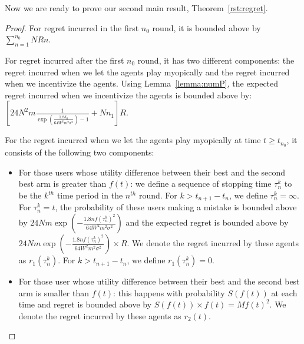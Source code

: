                     Now we are ready to prove our second main result, Theorem~\ref{rst:regret}.

                    \begin{proof}
                    For regret incurred in the first $n_0$ round, it is bounded above by $\sum_{n=1}^{n_{0}}NRn$.

                    For regret incurred after the first $n_0$ round, it has two different components: the regret incurred when we let the agents play myopically and the regret incurred when we incentivize the agents. Using Lemma~\ref{lemma:numP}, the expected regret incurred when we incentivize the agents is bounded above by: $\left[24N^2 m \frac{1}{\exp(\frac{1.8\delta_{0}}{64W^2 m^2\sigma^2})-1} + Nn_1\right]R$.

                    For the regret incurred when we let the agents play myopically at time $t\geq t_{n_0}$, it consists of the following two components:
                    \begin{itemize}
                    \item For those users whose utility difference between their best and the second best arm is greater than $f(t)$: we define a sequence of stopping time $\tau_{n}^{k}$ to be the $k^{th}$ time period in the $n^{th}$ round. For $k>t_{n+1}-t_{n}$, we define $\tau_{n}^{k}=\infty$. For $\tau_{n}^{k}=t$, the probability of these users making a mistake is bounded above by $24Nm\exp\left(-\frac{1.8n f(\tau_{n}^{k})^2}{64 W^2 m^2\sigma^2}\right)$ and the expected regret is bounded above by $24Nm\exp\left(-\frac{1.8n f(\tau_{n}^{k})^2}{64 W^2 m^2\sigma^2}\right)\times R$. We denote the regret incurred by these agents as $r_1(\tau_{n}^{k})$. For $k>t_{n+1}-t_{n}$, we define $r_1(\tau_{n}^{k})=0$.
                    \item For those user whose utility difference between their best and the second best arm is smaller than $f(t)$: this happens with probability $S(f(t))$ at each time and regret is bounded above by $S(f(t)) \times f(t)=Mf(t)^2$. We denote the regret incurred by these agents as $r_2(t)$.
                    \end{itemize}


\end{proof}
